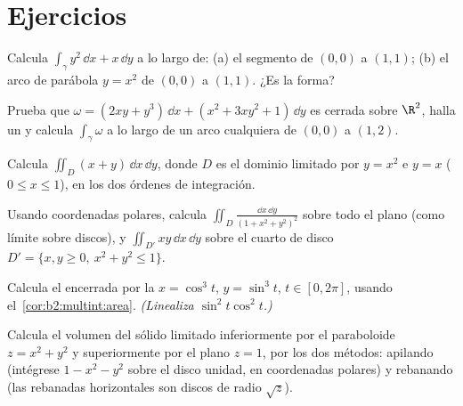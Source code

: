 \section{Ejercicios}

\begin{exercise}[$\star$]\label{exo:b2:multint:1}
Calcula $\int_\gamma y^2\,\dd x + x\,\dd y$ a lo largo de: (a) el
segmento de $(0,0)$ a $(1,1)$; (b) el arco de parábola $y = x^2$ de
$(0,0)$ a $(1,1)$. ¿Es  la forma?
\end{exercise}

\begin{exercise}[$\star$]\label{exo:b2:multint:2}
Prueba que $\omega = (2xy + y^3)\,\dd x + (x^2 + 3xy^2 + 1)\,\dd y$
es cerrada sobre $\R^2$, halla un  y calcula
$\int_\gamma\omega$ a lo largo de un arco cualquiera de $(0, 0)$ a
$(1, 2)$.
\end{exercise}

\begin{exercise}[$\star$]\label{exo:b2:multint:3}
Calcula $\iint_D (x + y)\,\dd x\,\dd y$, donde $D$ es el dominio
limitado por $y = x^2$ e $y = x$ ($0 \leq x \leq 1$), en los dos
órdenes de integración.
\end{exercise}

\begin{exercise}[$\star\star$]\label{exo:b2:multint:4}
Usando coordenadas polares, calcula $\iint_D \frac{\dd x\,\dd y}{(1 +
x^2 + y^2)^2}$ sobre todo el plano (como límite sobre discos), y
$\iint_{D'} xy\,\dd x\,\dd y$ sobre el cuarto de disco $D' = \{x, y
\geq 0,\ x^2 + y^2 \leq 1\}$.
\end{exercise}

\begin{exercise}[$\star\star$]\label{exo:b2:multint:5}
Calcula el  encerrada por la  $x = \cos^3 t$, $y = \sin^3
t$, $t \in [0, 2\pi]$, usando el~\cref{cor:b2:multint:area}. \emph{(Linealiza $\sin^2 t\cos^2 t$.)}
\end{exercise}

\begin{exercise}[$\star\star$]\label{exo:b2:multint:6}
Calcula el volumen del sólido limitado inferiormente por el
paraboloide $z = x^2 + y^2$ y superiormente por el plano $z = 1$, por
los dos métodos: apilando (intégrese $1 - x^2 - y^2$ sobre el disco
unidad, en coordenadas polares) y rebanando (las rebanadas
horizontales son discos de radio $\sqrt z$).
\end{exercise}

